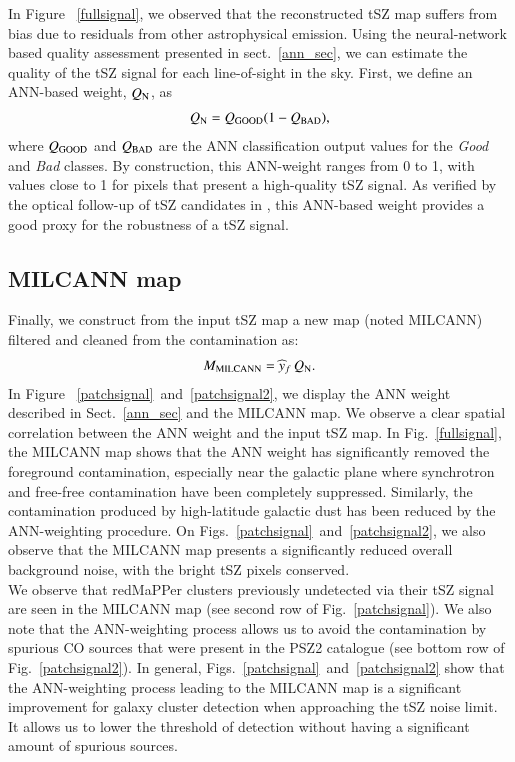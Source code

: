 \documentclass[traditabstract,a4,twocolumn]{aa}
\begin{document}
In Figure ~\ref{fullsignal}, we observed that the reconstructed tSZ map 
suffers from bias due to residuals from other astrophysical emission.  Using the neural-network based quality
assessment presented in sect.~\ref{ann_sec}, we can estimate
the quality of the tSZ signal for each line-of-sight in the sky.
First, we define an ANN-based weight, $Q_{\rm N}$, as
\begin{align}
Q_{\rm N} = Q_{\rm GOOD} (1-Q_{\rm BAD}),
\end{align}
where $Q_{\rm GOOD}$ and $Q_{\rm BAD}$ are the ANN classification
output values for the {\it Good} and {\it Bad} classes. By
construction, this ANN-weight ranges from 0 to 1, with
values close to 1 for pixels that present a high-quality tSZ signal. As verified by the optical follow-up of tSZ candidates in \citet{van16}, this ANN-based weight provides a good proxy for the robustness of a tSZ signal.\\


\subsection{MILCANN map}

Finally, we construct from the input tSZ map a new map (noted MILCANN) filtered and cleaned from the contamination as:
\begin{align}
M_{\rm MILCANN} = \widehat{y}_f \, Q_{\rm N}.
\end{align}
In Figure ~\ref{patchsignal}~and~\ref{patchsignal2}, we display the
ANN weight described in Sect.~\ref{ann_sec} and the MILCANN map. We
observe a clear spatial correlation between the ANN weight and the input tSZ map. 
In Fig.~\ref{fullsignal}, the MILCANN map shows that the ANN weight
has significantly removed the foreground contamination, especially
near the galactic plane where synchrotron and free-free contamination
have been completely suppressed. Similarly, the contamination produced
by high-latitude galactic dust has been reduced by the ANN-weighting procedure.  On
Figs.~\ref{patchsignal}~and~\ref{patchsignal2}, we also observe that the MILCANN map presents a significantly reduced overall background noise, with the bright tSZ pixels conserved. \\
We observe that redMaPPer clusters previously undetected via their tSZ signal are seen in the MILCANN map (see second row of Fig.~\ref{patchsignal}). We also note that the ANN-weighting process allows us to avoid the contamination by spurious CO sources that were present in the PSZ2 catalogue (see bottom row of Fig.~\ref{patchsignal2}). 
In general, Figs.~\ref{patchsignal}~and~\ref{patchsignal2} show that the ANN-weighting process leading to the MILCANN map is a significant improvement for galaxy cluster detection when approaching the tSZ noise limit. It allows us to lower the threshold of detection without having a significant amount of spurious sources.
\\
\end{document}
